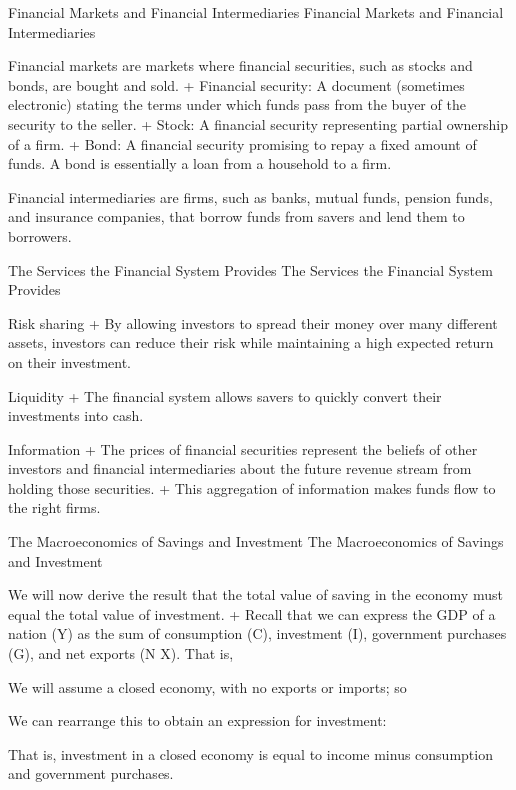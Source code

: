 \documentclass[
  12pt,
  ignorenonframetext,
]{beamer}
\begin{document}
\begin{frame}{Financial Markets and Financial Intermediaries}
\protect\hypertarget{financial-markets-and-financial-intermediaries}{}
Financial Markets and Financial Intermediaries

Financial markets are markets where financial securities, such as stocks
and bonds, are bought and sold. + Financial security: A document
(sometimes electronic) stating the terms under which funds pass from the
buyer of the security to the seller. + Stock: A financial security
representing partial ownership of a firm. + Bond: A financial security
promising to repay a fixed amount of funds. A bond is essentially a loan
from a household to a firm.

Financial intermediaries are firms, such as banks, mutual funds, pension
funds, and insurance companies, that borrow funds from savers and lend
them to borrowers.
\end{frame}

\begin{frame}{The Services the Financial System Provides}
\protect\hypertarget{the-services-the-financial-system-provides}{}
The Services the Financial System Provides

Risk sharing + By allowing investors to spread their money over many
different assets, investors can reduce their risk while maintaining a
high expected return on their investment.

Liquidity + The financial system allows savers to quickly convert their
investments into cash.

Information + The prices of financial securities represent the beliefs
of other investors and financial intermediaries about the future revenue
stream from holding those securities. + This aggregation of information
makes funds flow to the right firms.
\end{frame}

\begin{frame}{The Macroeconomics of Savings and Investment}
\protect\hypertarget{the-macroeconomics-of-savings-and-investment}{}
The Macroeconomics of Savings and Investment

We will now derive the result that the total value of saving in the
economy must equal the total value of investment. + Recall that we can
express the GDP of a nation (Y) as the sum of consumption (C),
investment (I), government purchases (G), and net exports (N X). That
is,

We will assume a closed economy, with no exports or imports; so

We can rearrange this to obtain an expression for investment:

That is, investment in a closed economy is equal to income minus
consumption and government purchases.
\end{frame}
\end{document}
